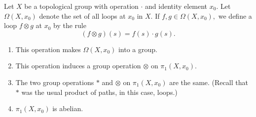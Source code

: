 \documentclass[12pt]{article}
\begin{document}
\begin{lem} \label{lem:topgroupfundabel}
	Let $X$ be a topological group with operation $\cdot$ and identity element $x_0.$ Let $\Omega(X, x_0)$ denote the set of all loops at $x_0$ in $X.$ If $f, g \in \Omega(X, x_0),$ we define a loop $f\otimes g$ at $x_0$ by the rule
	\begin{equation*} 
		(f \otimes g)(s) = f(s)\cdot g(s).
	\end{equation*}
	\begin{enumerate}
		\item This operation makes $\Omega(X, x_0)$ into a group.
		\item This operation induces a group operation $\otimes$ on $\pi_1(X, x_0).$
		\item The two group operations $*$ and $\otimes$ on $\pi_1(X, x_0)$ are the same. (Recall that $*$ was the usual product of paths, in this case, loops.)
		\item $\pi_1(X, x_0)$ is abelian.
	\end{enumerate}
\end{lem}
\end{document}
